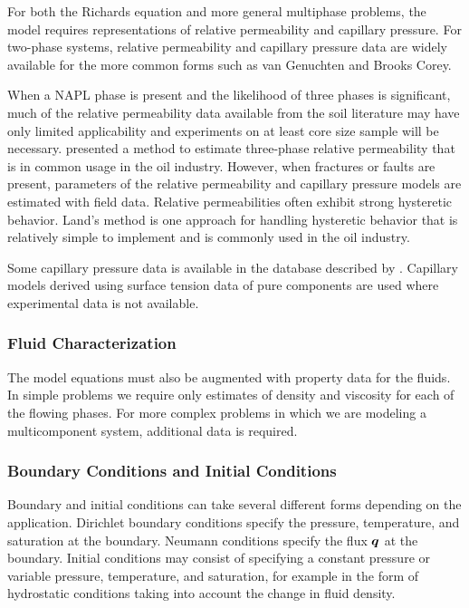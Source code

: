 For both the Richards equation and more general multiphase problems, the
model requires representations of relative permeability and capillary
pressure.  For two-phase systems, relative permeability and capillary
pressure data are widely available for the more common forms such as
van Genuchten and Brooks Corey.

When a NAPL phase is present and the likelihood of three phases is
significant, much of the relative permeability data available from the
soil literature may have only limited applicability and experiments on
at least core size sample will be necessary.
\citet{stone1973estimation} presented a method to estimate three-phase
relative permeability that is in common usage in the oil
industry. However, when fractures or faults are present, parameters of
the relative permeability and capillary pressure models are estimated
with field data.  Relative permeabilities often exhibit strong
hysteretic behavior.  Land's method
\citep{land1968calculation,spiteri2006impact} is one approach for
handling hysteretic behavior that is relatively simple to implement
and is commonly used in the oil industry.

 Some capillary pressure data is available in the database described
by \citet{schaap2001computer}. Capillary models derived using surface
tension data of pure components \citep{prausnitz1977properties} are
used where experimental data is not available.

\subsubsection{Fluid Characterization}

The model equations must also be augmented with property data for the
fluids.  In simple problems we require only estimates of density and
viscosity for each of the flowing phases.  For more complex problems
in which we are modeling a multicomponent system, additional data is
required.




\subsubsection{Boundary Conditions and Initial Conditions}

Boundary and initial conditions can take several different forms
depending on the application. Dirichlet boundary conditions specify
the pressure, temperature, and saturation at the boundary. Neumann
conditions specify the flux ${\boldsymbol{q}}$ at the boundary.  Initial conditions
may consist of specifying a constant pressure or variable pressure,
temperature, and saturation, for example in the form of hydrostatic
conditions taking into account the change in fluid density.

